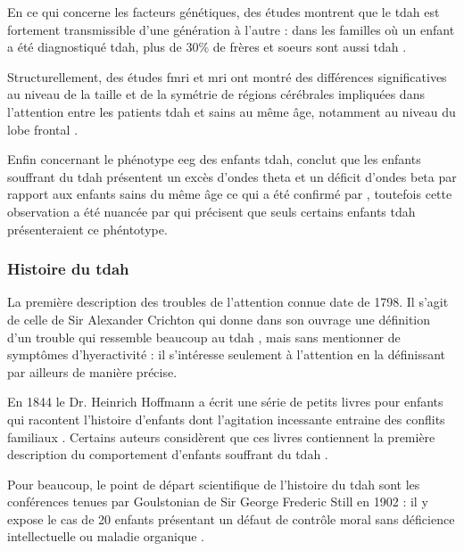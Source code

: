En ce qui concerne les facteurs génétiques, des études montrent que le \gls{tdah} est fortement transmissible d'une génération à l'autre \citep{Larsson2014} :
dans les familles où un enfant a été diagnostiqué \gls{tdah}, plus de 30\% de frères et soeurs sont aussi \gls{tdah} \citep{Monastra2005}.

Structurellement, des études \gls{fmri} et \gls{mri} ont montré des différences significatives au niveau de la taille et de la symétrie de régions cérébrales impliquées
dans l'attention entre les patients \gls{tdah} et sains au même âge, notamment au niveau du lobe frontal \citep{Monastra2005}.  

Enfin concernant le phénotype \gls{eeg} des enfants \gls{tdah}, \citet{Lubar1991} conclut que les enfants souffrant du \gls{tdah} présentent un excès 
d'ondes theta et un déficit d'ondes beta par rapport aux enfants sains du même âge ce qui a été confirmé par \citet{Barry2003}, toutefois cette observation 
a été nuancée par \citet{Arns2012} qui précisent que seuls certains enfants \gls{tdah} présenteraient ce phéntotype. 

\subsubsection{Histoire du \gls{tdah}} \label{adhd_history}

La première description des troubles de l'attention connue date de 1798. Il s'agit de celle de Sir Alexander Crichton qui donne dans son ouvrage 
une définition d'un trouble 
qui ressemble beaucoup au \gls{tdah} \citep{Crichton1798}, mais sans mentionner de symptômes d'hyeractivité : il s'intéresse seulement à l'attention
en la définissant par ailleurs de manière précise. 

En 1844 le Dr. Heinrich Hoffmann a écrit une série de petits livres pour enfants qui racontent l'histoire d'enfants dont l'agitation incessante 
entraine des conflits familiaux \citep{Lange2010}. Certains auteurs considèrent que ces livres contiennent la première description du comportement d'enfants 
souffrant du \gls{tdah} \citep{Burd1988, Kopf2006}.  

Pour beaucoup, le point de départ scientifique de l'histoire du \gls{tdah} sont les conférences tenues par Goulstonian de Sir George Frederic Still 
en 1902 \citep{Barkley2006, Conners2000, Palmer2001, Rafalovich2001} : il y expose le cas de 20 enfants présentant un défaut de contrôle moral sans
déficience intellectuelle ou maladie organique \citep{Still1902}. 

